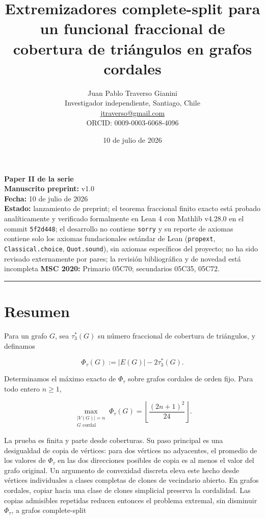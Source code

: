 \documentclass[
  11pt,
]{article}
\title{Extremizadores complete-split para un funcional fraccional de cobertura de triángulos en grafos cordales}
\author{Juan Pablo Traverso Gianini\\
\small Investigador independiente, Santiago, Chile\\
\small \href{mailto:jtraverso@gmail.com}{jtraverso@gmail.com}\\
\small ORCID: 0009-0003-6068-4096}
\date{10 de julio de 2026}
\begin{document}
\sloppy
\maketitle
\begin{small}\begin{raggedright}

\textbf{Paper II de la serie}\\
\textbf{Manuscrito preprint:} v1.0\\
\textbf{Fecha:} 10 de julio de 2026\\
\textbf{Estado:} lanzamiento de preprint; el teorema fraccional finito
exacto está probado analíticamente y verificado formalmente en Lean 4
con Mathlib v4.28.0 en el commit \texttt{5f2d448}; el desarrollo no
contiene \texttt{sorry} y su reporte de axiomas contiene solo los
axiomas fundacionales estándar de Lean (\texttt{propext},
\texttt{Classical.choice}, \texttt{Quot.sound}), sin axiomas específicos
del proyecto; no ha sido revisado externamente por pares; la revisión
bibliográfica y de novedad está incompleta \textbf{MSC 2020:} Primario
05C70; secundarios 05C35, 05C72.

\begin{center}\rule{0.5\linewidth}{0.5pt}\end{center}

\end{raggedright}\end{small}

\section{Resumen}\label{resumen}

Para un grafo \(G\), sea \(\tau_3^*(G)\) su número fraccional de
cobertura de triángulos, y definamos

\[
\Phi_\tau(G):=|E(G)|-2\tau_3^*(G).
\]

Determinamos el máximo exacto de \(\Phi_\tau\) sobre grafos cordales de
orden fijo. Para todo entero \(n\ge1\),

\[
\boxed{
\max_{\substack{|V(G)|=n\\G\text{ cordal}}}
\Phi_\tau(G)
=
\left\lfloor\frac{(2n+1)^2}{24}\right\rfloor.
}
\]

La prueba es finita y parte desde coberturas. Su paso principal es una
desigualdad de copia de vértices: para dos vértices no adyacentes, el
promedio de los valores de \(\Phi_\tau\) en las dos direcciones posibles
de copia es al menos el valor del grafo original. Un argumento de
convexidad discreta eleva este hecho desde vértices individuales a
clases completas de clones de vecindario abierto. En grafos cordales,
copiar hacia una clase de clones simplicial preserva la cordalidad. Las
copias admisibles repetidas reducen entonces el problema extremal, sin
disminuir \(\Phi_\tau\), a grafos complete-split
\end{document}
